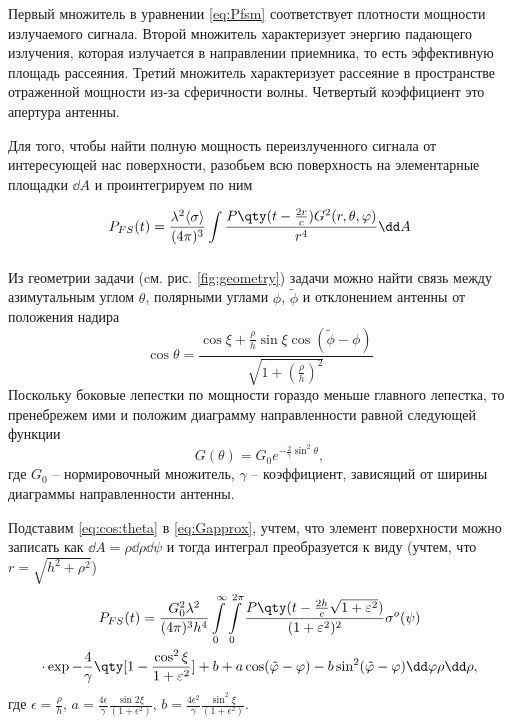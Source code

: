 Первый множитель в уравнении  \eqref{eq:Pfsm}  соответствует плотности мощности
излучаемого сигнала. Второй множитель характеризует энергию падающего
излучения, которая излучается в направлении приемника, то есть эффективную
площадь рассеяния. Третий множитель
характеризует рассеяние в пространстве отраженной мощности из-за
сферичности волны. Четвертый
коэффициент это апертура антенны.



Для того, чтобы найти полную мощность переизлученного сигнала от интересующей
нас поверхности,
разобьем всю поверхность на элементарные площадки $\dd A$ и проинтегрируем
по ним 

\begin{equation}
    P_{FS}(t) = \frac{\lambda^2\mean{\sigma}}{(4 \pi)^3 } \int\limits_{} 
    \frac
        {P\qty(t - \frac{2r}{c}) G^2(r,\theta,\phi) }
        {r^4} 
    \dd A
\end{equation}

 Из геометрии задачи (cм. рис. \ref{fig:geometry}) задачи можно найти связь между
 азимутальным углом $\theta$, полярными углами  $\phi$,  $\tilde \phi$ и
 отклонением антенны от положения надира
 \begin{equation}
     \label{eq:cos:theta}
     \cos \theta = 
     \frac{\cos \xi + \frac{\rho}{h} \sin \xi \cos(\tilde \phi - \phi)}{\sqrt{1
     + (\frac{\rho}{h})^2}}
 \end{equation}
 Поскольку боковые лепестки по мощности гораздо меньше главного лепестка, то
 пренебрежем ими и положим диаграмму направленности   равной следующей функции
 \begin{equation}
     \label{eq:Gapprox}
     G(\theta) = G_0 e^{-\frac{2}{\gamma} \sin^2 \theta},
 \end{equation}
 где $G_0$ -- нормировочный множитель,  $\gamma$ -- коэффициент, зависящий от
 ширины диаграммы направленности антенны.

 Подставим \eqref{eq:cos:theta} в \eqref{eq:Gapprox}, учтем, что  элемент
 поверхности можно записать как $\dd A = \rho \dd \rho \dd \psi$ и тогда
 интеграл преобразуется к виду  (учтем, что \newline$r = \sqrt{h^{2} + \rho^{2}}$)
 \begin{multline}
     P_{FS}(t) = \frac{G_0^2 \lambda^2}{(4 \pi)^3 h^4}
     \int\limits_{0}^{\infty} \int\limits_{0}^{2 \pi}   
     \frac{P\qty(t - \frac{2h}{c}\sqrt{1+ \epsilon^2})}{(1+\epsilon^2)^2} \sigma^o(\psi)
     \\
     \cdot \exp{-\frac{4}{\gamma} \qty[1 - \frac{\cos^2 \xi}{1+ \epsilon^2}] + b
     + a\cos(\tilde \phi - \phi) - b \sin^2(\tilde \phi - \phi)} \dd \phi \rho
     \dd \rho,
 \end{multline}
 где 
 $\epsilon = \frac{\rho}{h}$,
 $a = \frac{4\epsilon}{\gamma} \frac{\sin 2 \xi}{(1+ \epsilon^2)}$,
 $b= \frac{4\epsilon^2}{\gamma} \frac{\sin^2 \xi}{(1+\epsilon^2)}$.

